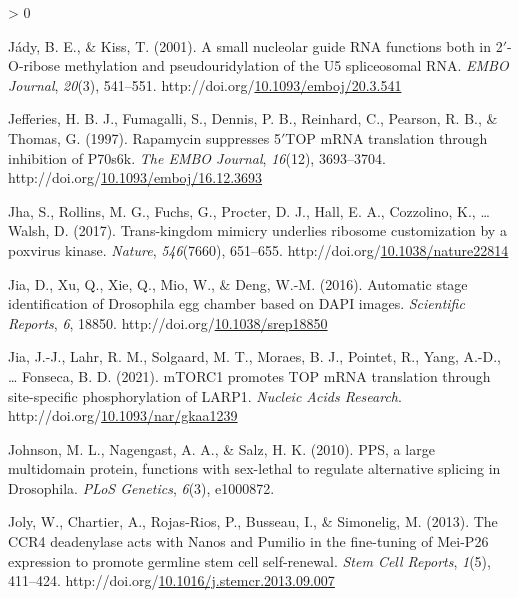 \documentclass[12pt,oneside]{reedthesis}
\newlength{\cslhangindent}
\newenvironment{CSLReferences}[2] %
 {%
  \setlength{\parindent}{0pt}
  \ifodd #1 \everypar{\setlength{\hangindent}{\cslhangindent}}\ignorespaces\fi
  \ifnum #2 > 0
  \setlength{\parskip}{#2\baselineskip}
  \fi
 }%
 {}
\begin{document}
\begin{CSLReferences}{1}{0}
\leavevmode\hypertarget{ref-Jady2001c}{}%
Jády, B. E., \& Kiss, T. (2001). A small nucleolar guide {RNA} functions both in 2{\({'}\)}-{O-ribose} methylation and pseudouridylation of the {U5} spliceosomal {RNA}. \emph{EMBO Journal}, \emph{20}(3), 541--551. http://doi.org/\href{https://doi.org/10.1093/emboj/20.3.541}{10.1093/emboj/20.3.541}

\leavevmode\hypertarget{ref-jefferiesRapamycinSuppressesTOP1997}{}%
Jefferies, H. B. J., Fumagalli, S., Dennis, P. B., Reinhard, C., Pearson, R. B., \& Thomas, G. (1997). Rapamycin suppresses 5{\({'}\)}{TOP mRNA} translation through inhibition of P70s6k. \emph{The EMBO Journal}, \emph{16}(12), 3693--3704. http://doi.org/\href{https://doi.org/10.1093/emboj/16.12.3693}{10.1093/emboj/16.12.3693}

\leavevmode\hypertarget{ref-jhaTranskingdomMimicryUnderlies2017}{}%
Jha, S., Rollins, M. G., Fuchs, G., Procter, D. J., Hall, E. A., Cozzolino, K., \ldots{} Walsh, D. (2017). Trans-kingdom mimicry underlies ribosome customization by a poxvirus kinase. \emph{Nature}, \emph{546}(7660), 651--655. http://doi.org/\href{https://doi.org/10.1038/nature22814}{10.1038/nature22814}

\leavevmode\hypertarget{ref-Jia2016b}{}%
Jia, D., Xu, Q., Xie, Q., Mio, W., \& Deng, W.-M. (2016). Automatic stage identification of {Drosophila} egg chamber based on {DAPI} images. \emph{Scientific Reports}, \emph{6}, 18850. http://doi.org/\href{https://doi.org/10.1038/srep18850}{10.1038/srep18850}

\leavevmode\hypertarget{ref-jiaMTORC1PromotesTOP2021}{}%
Jia, J.-J., Lahr, R. M., Solgaard, M. T., Moraes, B. J., Pointet, R., Yang, A.-D., \ldots{} Fonseca, B. D. (2021). {mTORC1} promotes {TOP mRNA} translation through site-specific phosphorylation of {LARP1}. \emph{Nucleic Acids Research}. http://doi.org/\href{https://doi.org/10.1093/nar/gkaa1239}{10.1093/nar/gkaa1239}

\leavevmode\hypertarget{ref-Johnson2010}{}%
Johnson, M. L., Nagengast, A. A., \& Salz, H. K. (2010). {PPS}, a large multidomain protein, functions with sex-lethal to regulate alternative splicing in {Drosophila}. \emph{PLoS Genetics}, \emph{6}(3), e1000872.

\leavevmode\hypertarget{ref-Joly2013f}{}%
Joly, W., Chartier, A., Rojas-Rios, P., Busseau, I., \& Simonelig, M. (2013). The {CCR4} deadenylase acts with {Nanos} and {Pumilio} in the fine-tuning of {Mei-P26} expression to promote germline stem cell self-renewal. \emph{Stem Cell Reports}, \emph{1}(5), 411--424. http://doi.org/\href{https://doi.org/10.1016/j.stemcr.2013.09.007}{10.1016/j.stemcr.2013.09.007}


\end{CSLReferences}
\end{document}
